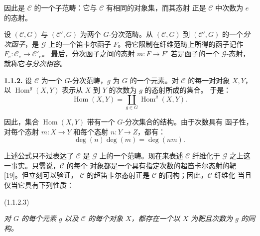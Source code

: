 \clearpage
{}%
%
因此是 $\mathcal C$ 的一个子范畴：它与 $\mathcal C$ 有相同的对象集，而其态射
正是 $\mathcal C$ 中次数为 $e$ 的态射。

设 $(\mathcal C,G)$ 与 $(\mathcal C',G)$ 为两个 $G$-分次范畴。从
$(\mathcal C,G)$ 到 $(\mathcal C',G)$ 的一个\emph{分次函子}，是
$\mathcal G$ 上的一个笛卡尔函子 $F$。将它限制在纤维范畴上所得的函子记作
$F_e\colon\mathcal C_e\to\mathcal C'_e$。
最后，分次函子之间的态射 $m\colon F\to F'$ 若是函子的一个
$\mathcal G$-态射，就称它\emph{与分次相容}。

\noindent\textbf{1.1.2.}\quad
设 $\mathcal C$ 为一个 $G$-分次范畴，$g$ 为 $G$ 的一个元素。对
$\mathcal C$ 的每一对对象 $X,Y$，以
%
$\operatorname{Hom}^{g}(X,Y)$ 表示从 $X$ 到 $Y$ 的次数为 $g$ 的态射所成的集合。
于是：
\begingroup
\makeatletter
\tagsleft@true
\let\veqno\@@leqno
\makeatother
\begin{equation}
  \operatorname{Hom}(X,Y)
  =\coprod_{g\in G}\operatorname{Hom}^{g}(X,Y).
  \tag{1.1.2.1}
\end{equation}
\endgroup

因此，集合 $\operatorname{Hom}(X,Y)$ 带有一个 $G$-分次集合的结构。由于次数具有
函子性，对每个态射 $m\colon X\to Y$ 和每个态射 $n\colon Y\to Z$，都有：
\begin{equation}
  \deg(n)\deg(m)=\deg(nm).
  \tag{1.1.2.2}
\end{equation}

上述公式只不过表达了 $\mathcal C$ 是 $\mathcal G$ 上的一个范畴。现在来表述
$\mathcal C$ 纤维化于 $\mathcal G$ 之上这一事实。只需说，$\mathcal C$ 的每个
对象都是一个具有指定次数的超笛卡尔态射的靶 [19]。但立刻可以验证，
$\mathcal C$ 的超笛卡尔态射正是 $\mathcal C$ 的同构；因此，$\mathcal C$ 纤维化
当且仅当它具有下列性质：

\noindent\textnormal{(1.1.2.3)}\quad
\begin{minipage}[t]{0.78\textwidth}
\emph{对 $G$ 的每个元素 $g$ 以及 $\mathcal C$ 的每个对象 $X$，都存在一个以
$X$ 为靶且次数为 $g$ 的同构。}
\end{minipage}
\par\medskip

